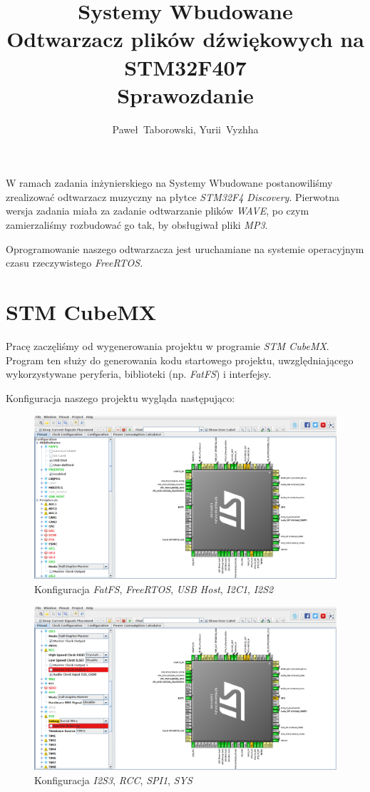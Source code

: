 \documentclass[12pt,a4paper]{article}
\author{Paweł~Taborowski, Yurii~Vyzhha}
\title{Systemy Wbudowane \\Odtwarzacz plików dźwiękowych na STM32F407\\Sprawozdanie}
\begin{document}
  \maketitle
W ramach zadania inżynierskiego na Systemy Wbudowane postanowiliśmy zrealizować odtwarzacz muzyczny na płytce  \emph{STM32F4 Discovery}. Pierwotna wersja zadania miała za zadanie odtwarzanie plików \emph{WAVE}, po czym zamierzaliśmy rozbudować go tak, by obsługiwał pliki \emph{MP3}.

Oprogramowanie naszego odtwarzacza jest uruchamiane na systemie operacyjnym czasu rzeczywistego \textit{FreeRTOS}.

\section{STM CubeMX}
Pracę zaczęliśmy od wygenerowania projektu w programie \emph{STM CubeMX}. Program ten służy do generowania kodu startowego projektu, uwzględniającego wykorzystywane peryferia, biblioteki (np. \textit{FatFS}) i interfejsy.

Konfiguracja naszego projektu wygląda następująco:

\begin{figure}[H]
 \centerline{\includegraphics[width=\textwidth]{img/img1}}
 \caption{Konfiguracja \emph{FatFS}, \emph{FreeRTOS}, \emph{USB Host}, \emph{I2C1}, \emph{I2S2}}
 \label{img1}
\end{figure}

\begin{figure}[H]
 \centerline{\includegraphics[width=\textwidth]{img/img2}}
 \caption{Konfiguracja \emph{I2S3}, \emph{RCC}, \emph{SPI1}, \emph{SYS}}
 \label{img2}
\end{figure}
\end{document}
